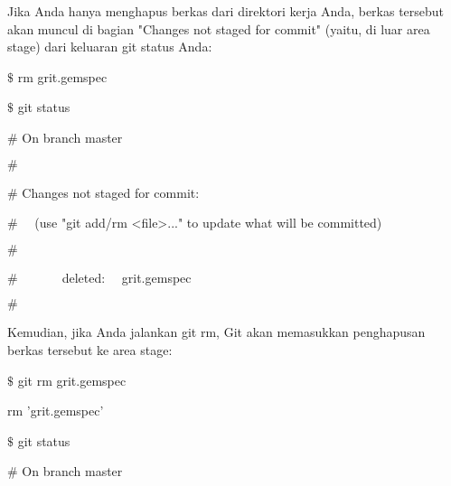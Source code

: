 \noindent 
{\fontsize{14pt}{14pt}\selectfont Jika Anda hanya menghapus berkas dari direktori kerja Anda, berkas tersebut akan muncul di bagian "Changes not staged for commit" (yaitu, di luar area stage) dari keluaran $  $git status $  $Anda: \\} \par
\vspace{14pt}
\noindent 
{\fontsize{14pt}{14pt}\selectfont  $  \$  $ rm grit.gemspec \\} \par
\noindent 
{\fontsize{14pt}{14pt}\selectfont  $  \$  $ git status \\} \par
\noindent 
{\fontsize{14pt}{14pt}\selectfont  $  \#  $ On branch master \\} \par
\noindent 
{\fontsize{14pt}{14pt}\selectfont  $  \#  $ \\} \par
\noindent 
{\fontsize{14pt}{14pt}\selectfont  $  \#  $ Changes not staged for commit: \\} \par
\noindent 
{\fontsize{14pt}{14pt}\selectfont  $  \#  $~~ (use "git add/rm <file>..." to update what will be committed) \\} \par
\noindent 
{\fontsize{14pt}{14pt}\selectfont  $  \#  $ \\} \par
\noindent 
{\fontsize{14pt}{14pt}\selectfont  $  \#  $~~~~~~~deleted:~~  grit.gemspec \\} \par
\noindent 
{\fontsize{14pt}{14pt}\selectfont  $  \#  $ \\} \par
\noindent 
{\fontsize{14pt}{14pt}\selectfont Kemudian, jika Anda jalankan $  $git rm, Git akan memasukkan penghapusan berkas tersebut ke area stage: \\} \par
\noindent 
{\fontsize{14pt}{14pt}\selectfont  $  \$  $ git rm grit.gemspec \\} \par
\noindent 
{\fontsize{14pt}{14pt}\selectfont rm 'grit.gemspec' \\} \par
\noindent 
{\fontsize{14pt}{14pt}\selectfont  $  \$  $ git status \\} \par
\noindent 
{\fontsize{14pt}{14pt}\selectfont  $  \#  $ On branch master \\} \par
